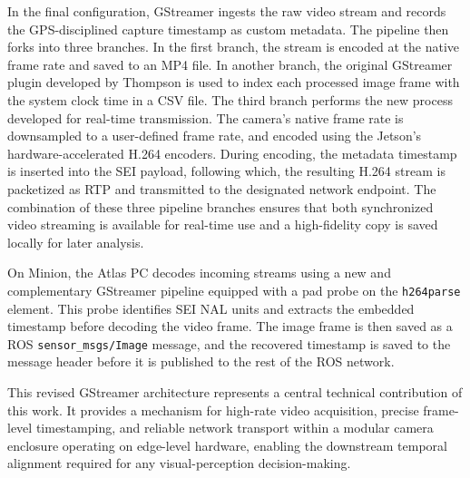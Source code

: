 \documentclass{erauthesis}
\begin{document}
In the final configuration, GStreamer ingests the raw video stream and records the GPS-disciplined capture timestamp as custom metadata. The pipeline then forks into three branches. 
In the first branch, the stream is encoded at the native frame rate and saved to an MP4 file. In another branch, the original GStreamer plugin developed by Thompson \cite{thompson2023} is used to index each processed image frame with the system clock time in a CSV file.
The third branch performs the new process developed for real-time transmission. 
The camera’s native frame rate is downsampled to a user-defined frame rate, and encoded using the Jetson’s hardware-accelerated H.264 encoders. During encoding, the metadata timestamp is inserted into the SEI payload, following which, the resulting H.264 stream is packetized as RTP and transmitted to the designated network endpoint.
The combination of these three pipeline branches ensures that both synchronized video streaming is available for real-time use and a high-fidelity copy is saved locally for later analysis. 

On Minion, the Atlas PC decodes incoming streams using a new and complementary GStreamer pipeline equipped with a pad probe on the \texttt{h264parse} element. This probe identifies SEI NAL units and extracts the embedded timestamp before decoding the video frame. The image frame is then saved as a ROS \texttt{sensor\_msgs/Image} message, and the recovered timestamp is saved to the message header before it is published to the rest of the ROS network.

This revised GStreamer architecture represents a central technical contribution of this work. It provides a mechanism for high-rate video acquisition, precise frame-level timestamping, and reliable network transport within a modular camera enclosure operating on edge-level hardware, enabling the downstream temporal alignment required for any visual-perception decision-making.
\end{document}
